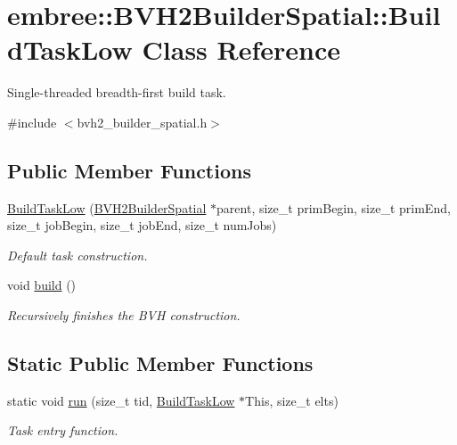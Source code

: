 \hypertarget{classembree_1_1_b_v_h2_builder_spatial_1_1_build_task_low}{
\section{embree::BVH2BuilderSpatial::BuildTaskLow Class Reference}
\label{classembree_1_1_b_v_h2_builder_spatial_1_1_build_task_low}
}


Single-\/threaded breadth-\/first build task.  




{\ttfamily \#include $<$bvh2\_\-builder\_\-spatial.h$>$}

\subsection*{Public Member Functions}
\begin{DoxyCompactItemize}
\item 
\hyperlink{classembree_1_1_b_v_h2_builder_spatial_1_1_build_task_low_a3a0c2ab37c1cd89f9f0d2931b1f34290}{BuildTaskLow} (\hyperlink{classembree_1_1_b_v_h2_builder_spatial}{BVH2BuilderSpatial} $\ast$parent, size\_\-t primBegin, size\_\-t primEnd, size\_\-t jobBegin, size\_\-t jobEnd, size\_\-t numJobs)
\begin{DoxyCompactList}\small\item\em Default task construction. \item\end{DoxyCompactList}\item 
void \hyperlink{classembree_1_1_b_v_h2_builder_spatial_1_1_build_task_low_ad5ac8a766b968d10accd9718d232fa03}{build} ()
\begin{DoxyCompactList}\small\item\em Recursively finishes the BVH construction. \item\end{DoxyCompactList}\end{DoxyCompactItemize}
\subsection*{Static Public Member Functions}
\begin{DoxyCompactItemize}
\item 
static void \hyperlink{classembree_1_1_b_v_h2_builder_spatial_1_1_build_task_low_a9b327dcd359a5e791d561ca2b542e1b2}{run} (size\_\-t tid, \hyperlink{classembree_1_1_b_v_h2_builder_spatial_1_1_build_task_low}{BuildTaskLow} $\ast$This, size\_\-t elts)
\begin{DoxyCompactList}\small\item\em Task entry function. \item\end{DoxyCompactList}\end{DoxyCompactItemize}


